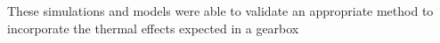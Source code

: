 These simulations and models were able to validate an appropriate method to incorporate the thermal effects expected in a gearbox